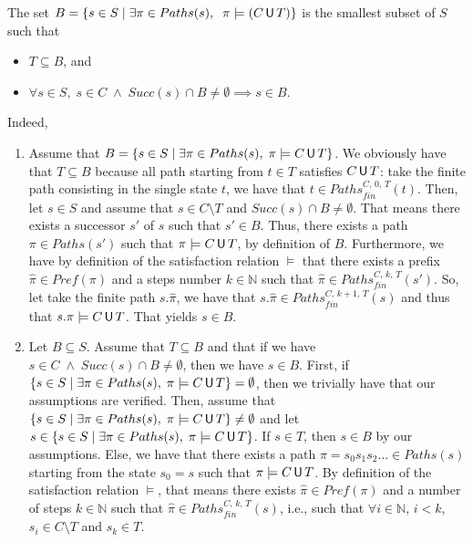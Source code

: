 \begin{proof2}
The set $B = \{ s \in S \; | \; \exists \pi \in Paths(s), \;\; \pi \models (C \,\text{\sffamily U}\, T) \}$ is the smallest subset of $S$ such that
\begin{itemize}
  \item $T \subseteq B$, and
  \item $\forall s \in S, \; s \in C \; \wedge \; Succ(s) \cap B \neq \emptyset \implies s \in B$.
\end{itemize}
Indeed,
\begin{enumerate}
  \item Assume that $B = \{s \in S \; | \; \exists \pi \in Paths(s), \; \pi \models C\,\text{\sffamily U}\, T\}$. We obviously have that $T \subseteq B$ because all path starting from $t \in T$ satisfies $C \,\text{\sffamily U}\, T$: take the finite path consisting in the single state $t$, we have that
  $t \in Paths_{fin}^{C, \, 0,\, T}(t)$.
  Then, let $s \in S$ and assume that $s \in C \setminus T$ and $Succ(s) \cap B \neq \emptyset$. That means there exists a successor $s'$ of $s$ such that $s' \in B$. Thus, there exists
  a path $\pi \in Paths(s')$ such that $\pi \models C\,\text{\sffamily U}\, T$, by definition of $B$. Furthermore, we have by definition of the satisfaction relation $\models$ that there exists a prefix $\hat{\pi}\in Pref(\pi)$ and a steps number $k \in \mathbb{N}$ such that $\hat{\pi} \in Paths_{fin}^{C, \, k,\, T}(s')$. So, let take the finite path $s.\hat{\pi}$, we have that $s.\hat{\pi} \in Paths^{C, \, k+1, \, T}_{fin}(s)$
  and thus that $s.\pi \models C \,\text{\sffamily U}\, T$. That yields $s \in B$.
  \item Let $B \subseteq S$. Assume that $T \subseteq B$ and that if we have $s \in C \; \wedge \; Succ(s) \cap B \neq \emptyset$, then we have $s \in B$. First, if $\{s \in S \; | \; \exists \pi \in Paths(s), \; \pi \models C \,\text{\sffamily U}\, T\} = \emptyset$,
  then we trivially have that our assumptions are verified. Then, assume that $\{s\in S \; | \; \exists \pi \in Paths(s), \; \pi \models C \,\text{\sffamily U}\, T\} \neq \emptyset$ and let $s \in \{s\in S \; | \; \exists \pi \in Paths(s), \; \pi \models C \,\text{\sffamily U}\, T\}$. If $s \in T$, then $s \in B$ by our assumptions.
  Else, we have that there exists a path $\pi = s_0 s_1 s_2 \dots \in Paths(s)$ starting from the state $s_0=s$ such that  $\pi \models C \,\text{\sffamily U}\, T$.
  By definition of the satisfaction relation $\models$, that means there exists
  $\hat{\pi} \in Pref(\pi)$ and a number of steps $k \in \mathbb{N}$ such that $\hat{\pi} \in Paths_{fin}^{C, \, k, \, T}(s)$, i.e., such that $\forall i \in \mathbb{N}$, $i < k$, $s_i \in C \setminus T$ and $s_k \in T$.

\end{enumerate}
\end{proof2}
